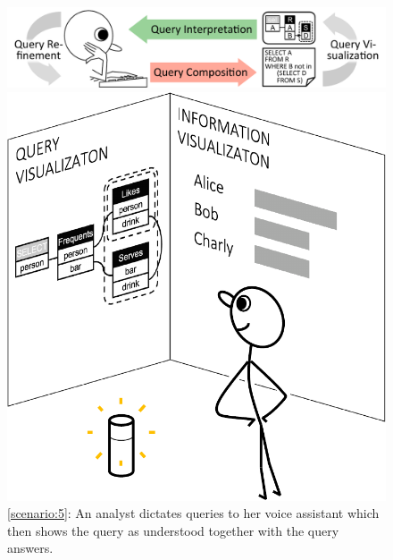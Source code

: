 \documentclass[letterpaper,11pt]{article}
\begin{document}


\begin{figure}
    \centering
    \begin{minipage}{0.5\textwidth}
        \centering
        \includegraphics[scale=0.425]{figs/Fig_TheVision}
		\caption{The goal of query visualization is to complement (but not substitute) the composition of queries 
		by creating automatic visualizations of queries. 
		Composition of a query is still performed via unambiguous and expressive text. 
		The transformation from text into a visualization can abstract away from a concrete syntax and thus be non-injective. 
		Compare to the write-format-preview cycle used by LaTeX~\cite{latex} in that a user writes text, 
		the system then autoformats and renders a document, 
		which the user can then peview.
		}
		\label{Fig_TheVision}
    \end{minipage}
	\hfill
    \begin{minipage}{0.45\textwidth}
        \centering
        \includegraphics[scale=0.36]{figs/Fig_SpeechAssistantv2}
		\caption{\autoref{scenario:5}: An analyst dictates queries to her voice assistant which then shows the query as understood 
		together with the query answers.}
		\label{Fig_SpeechAssistant}
    \end{minipage}
\end{figure}
\end{document}
